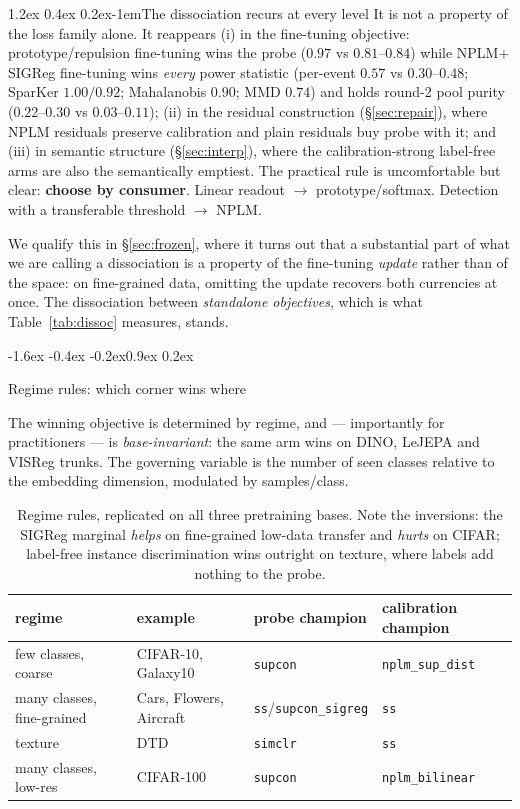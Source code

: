 \documentclass{article}
\makeatletter
\renewcommand\subsection{\@startsection{subsection}{2}{\z@}%
  {-1.6ex \@plus -0.4ex \@minus -0.2ex}{0.9ex \@plus 0.2ex}%
  {\normalsize\bf\raggedright}}
\renewcommand\paragraph{\@startsection{paragraph}{4}{\z@}%
  {1.2ex \@plus 0.4ex \@minus 0.2ex}{-1em}{\normalsize\bf}}
\makeatother
\begin{document}
\paragraph{The dissociation recurs at every level}
It is not a property of the loss family alone. It reappears (i) in the
fine-tuning objective: prototype/repulsion fine-tuning wins the probe
($0.97$ vs $0.81$--$0.84$) while NPLM$+$SIGReg fine-tuning wins \emph{every}
power statistic (per-event $0.57$ vs $0.30$--$0.48$; SparKer $1.00/0.92$;
Mahalanobis $0.90$; MMD $0.74$) and holds round-2 pool purity ($0.22$--$0.30$
vs $0.03$--$0.11$); (ii) in the residual construction (\S\ref{sec:repair}),
where NPLM residuals preserve calibration and plain residuals buy probe with
it; and (iii) in semantic structure (\S\ref{sec:interp}), where the
calibration-strong label-free arms are also the semantically emptiest. The
practical rule is uncomfortable but clear: \textbf{choose by consumer}. Linear
readout $\to$ prototype/softmax. Detection with a transferable threshold $\to$
NPLM.

We qualify this in \S\ref{sec:frozen}, where it turns out that a substantial
part of what we are calling a dissociation is a property of the fine-tuning
\emph{update} rather than of the space: on fine-grained data, omitting the
update recovers both currencies at once. The dissociation between
\emph{standalone objectives}, which is what Table~\ref{tab:dissoc} measures,
stands.

\subsection{Regime rules: which corner wins where}
\label{sec:regimes}

The winning objective is determined by regime, and --- importantly for
practitioners --- is \emph{base-invariant}: the same arm wins on DINO, LeJEPA
and VISReg trunks. The governing variable is the number of seen classes
relative to the embedding dimension, modulated by samples/class.

\begin{table}[t]\centering\small
\begin{tabular}{llll}
\toprule
regime & example & probe champion & calibration champion \\
\midrule
few classes, coarse       & CIFAR-10, Galaxy10 & \texttt{supcon} & \texttt{nplm\_sup\_dist} \\
many classes, fine-grained & Cars, Flowers, Aircraft & \texttt{ss}/\texttt{supcon\_sigreg} & \texttt{ss} \\
texture                    & DTD & \texttt{simclr} & \texttt{ss} \\
many classes, low-res      & CIFAR-100 & \texttt{supcon} & \texttt{nplm\_bilinear} \\
\bottomrule
\end{tabular}
\caption{Regime rules, replicated on all three pretraining bases. Note the
inversions: the SIGReg marginal \emph{helps} on fine-grained low-data transfer
and \emph{hurts} on CIFAR; label-free instance discrimination wins outright on
texture, where labels add nothing to the probe.}
\label{tab:regimes}
\end{table}
\end{document}

